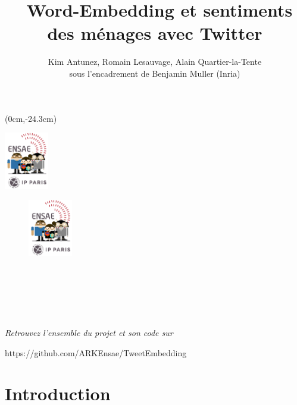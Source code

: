 \documentclass[11pt,french,french]{article}
\title{~Word-Embedding et sentiments des ménages avec Twitter}
\author{Kim Antunez, Romain Lesauvage, Alain Quartier-la-Tente\\
sous l'encadrement de Benjamin Muller (Inria)}
\date{}
\begin{document}
\maketitle


{
\hypersetup{linkcolor=black}
\setcounter{tocdepth}{2}
\tableofcontents
}
\begin{textblock*}{\textwidth}(0cm,-24.3cm)
\begin{center}
\includegraphics[height=2.5cm]{img/LOGO-ENSAE.png}
\end{center}
\end{textblock*}

\newpage

\begin{center}
\begin{minipage}{0.7\textwidth}

\begin{figure}
\includegraphics[height=2.5cm]{img/LOGO-ENSAE.png}
\end{figure}

$\phantom{saut}$

$\phantom{saut}$

$\phantom{saut}$


\emph{Retrouvez l'ensemble du projet et son code sur}

https://github.com/ARKEnsae/TweetEmbedding

\end{minipage}
\end{center}

\vspace{0.5cm}

\hypertarget{introduction}{%
\section*{Introduction}\label{introduction}}
\end{document}

